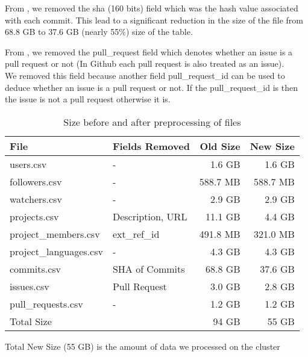 From , we removed the sha (160 bits) field which was the hash value associated with each commit. This lead to a significant reduction in the size of the file from 68.8 GB to 37.6 GB (nearly 55\%) size of the table. \\ \linebreak

From , we removed the pull\_request field which denotes whether an issue is a pull request or not (In Github each pull request is also treated as an issue).\\
We removed this field because another field pull\_request\_id can be used to deduce whether an issue is a pull request or not. If the pull\_request\_id is  then the issue is not a pull request otherwise it is.


\vspace{25px}
\begin{table}[htb]
    \centering

    \begin{tabular}{@{}llrr@{}}
    \toprule
        File & Fields Removed & Old Size & New Size \\
    \midrule
        users.csv              & -                &   1.6 GB &    1.6 GB \\
        followers.csv          & -                & 588.7 MB &  588.7 MB \\
        watchers.csv           & -                &   2.9 GB &    2.9 GB \\
        projects.csv           & Description, URL &  11.1 GB &    4.4 GB \\
        project\_members.csv   & ext\_ref\_id     & 491.8 MB &  321.0 MB \\
        project\_languages.csv & -                &   4.3 GB &    4.3 GB \\
        commits.csv            & SHA of Commits   &  68.8 GB &   37.6 GB \\
        issues.csv             & Pull Request     &   3.0 GB &    2.8 GB \\
        pull\_requests.csv     & -                &   1.2 GB &    1.2 GB \\
    \midrule
        Total Size             &                  &    94 GB &     55 GB \\
    \bottomrule
    \end{tabular}

    \caption{Size before and after preprocessing of files}
    \small{Total New Size (55 GB) is the amount of data we processed on the cluster}
\end{table}


